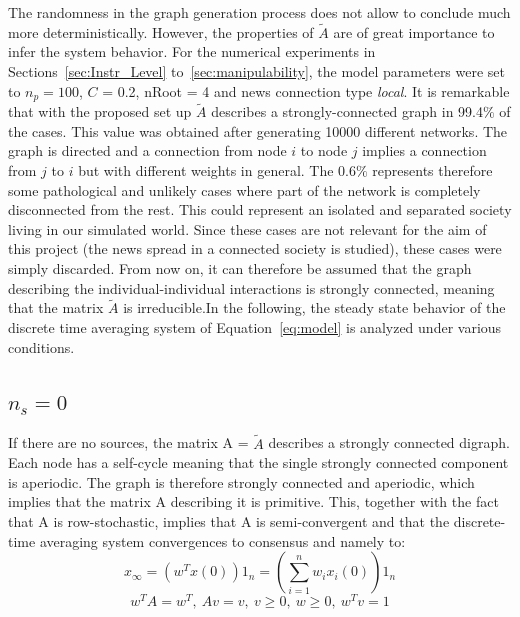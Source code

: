 The randomness in the graph generation process does not allow to conclude much more deterministically. However, the properties of $\tilde{A}$ are of great importance to infer the system behavior.
For the numerical experiments in
Sections~\ref{sec:Instr_Level} to~\ref{sec:manipulability}, the model parameters were set to $n_p = 100$, $C$ = 0.2, nRoot = 4 and news connection type \textit{local}. It is remarkable that with the proposed set up $\tilde{A}$ describes a strongly-connected graph in 99.4$\%$ of the cases. This value was obtained after generating 10000 different networks.
 The graph is directed and a connection from node $i$ to node $j$ implies a connection from $j$ to $i$ but with different weights in general. The 0.6$\%$ represents therefore some pathological and unlikely cases where part of the network is completely disconnected from the rest. This could represent an isolated and separated society living in our simulated world. Since these cases are not relevant for the aim of this project (the news spread in a connected society is studied), these cases were simply discarded. From now on, it can therefore be assumed that the graph describing the individual-individual interactions is strongly connected, meaning that the matrix $\tilde{A}$ is irreducible.\newline In the following, the steady state behavior of the discrete time averaging system of Equation~\eqref{eq:model}
is analyzed under various conditions.

\subsection{$n_s = 0$}
If there are no sources, the matrix A = $\tilde{A}$ describes a strongly connected digraph. Each node has a self-cycle meaning that the single strongly connected component is aperiodic. The graph is therefore strongly connected and aperiodic, which implies that the matrix A describing it is primitive. This, together with the fact that A is row-stochastic, implies that A is semi-convergent and that the discrete-time averaging system convergences to consensus and namely to:
$$
x_{\infty} = (w^Tx(0))1_n = \left(\sum_{i=1}^{n}w_ix_i(0)\right)1_n
$$
$$
w^TA = w^T,\ 
Av = v,\ 
v \geq 0,\ w \geq 0,\ w^Tv = 1
$$
